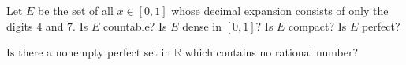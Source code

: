   \begin{exercise}[Rudin 2.17]
    Let $E$ be the set of all $x \in [0, 1]$ whose decimal expansion consists of only the digits $4$ and $7$. Is $E$ countable? Is $E$ dense in $[0, 1]$? Is $E$ compact? Is $E$ perfect? 
  \end{exercise}
  \begin{solution}
    
  \end{solution}

  \begin{exercise}[Rudin 2.18]
    Is there a nonempty perfect set in $\mathbb{R}$ which contains no rational number? 
  \end{exercise}
  \begin{solution}
    
  \end{solution}

